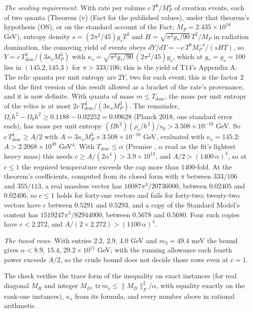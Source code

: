 \emph{The seeding requirement.} With rate per volume $c\,T^{8}/M_{P}^{4}$ of creation events, each of two quanta (Theorem (v) (Fact  for the published values), under that theorem's hypothesis (OS), or on the standard account of the Fact; $M_{P} = 2.435 \times 10^{18}$ GeV), entropy density $s = (2\pi^{2}/45)g_{s}T^{3}$ and $H = \sqrt{\pi^{2}g_{*}/90}\,T^{2}/M_{P}$ in radiation domination, the comoving yield of events obeys $dY/dT = -c\,T^{8}M_{P}^{-4}/(sHT)$, so $Y = c\,T_{\mathrm{desc}}^{3}/(3\kappa_{s}M_{P}^{3})$ with $\kappa_{s} = \sqrt{\pi^{2}g_{*}/90}\,(2\pi^{2}/45)g_{s}$, which at $g_{*} = g_{s} = 100$ lies in $(145.2, 145.3)$ for $\pi > 333/106$; this is the yield of T14's Appendix A. The relic quanta per unit entropy are $2Y$, two for each event; this is the factor $2$ that the first version of this result allowed as a bracket of the rate's provenance, and it is now definite. With quanta of mass $m \le T_{\mathrm{desc}}$, the mass per unit entropy of the relics is at most $2c\,T_{\mathrm{desc}}^{4}/(3\kappa_{s}M_{P}^{3})$. The remainder, $\Omega_{c}h^{2} - \Omega_{b}h^{2} \ge 0.1188 - 0.02252 = 0.09628$ (Planck 2018, one standard error each), has mass per unit entropy $(\Omega h^{2})(\rho_{c}/h^{2})/s_{0} > 3.508 \times 10^{-10}$ GeV. So $c\,T_{\mathrm{desc}}^{4} \ge A/2$ with $A = 3\kappa_{s}M_{P}^{3} \times 3.508 \times 10^{-10}$ GeV, evaluated with $\kappa_{s} = 145.2$: $A > 2.2068 \times 10^{48}$ GeV$^{4}$. With $T_{\mathrm{desc}} \le \alpha$ (Premise , $\alpha$ read as the fit's lightest heavy mass) this needs $c \ge A/(2\alpha^{4}) > 3.9 \times 10^{12}$, and $A/2 > (1400\,\alpha)^{4}$, so at $c \le 1$ the required temperature exceeds the cap more than $1400$-fold. At the theorem's coefficients, computed from its closed form with $\pi$ between $333/106$ and $355/113$, a real massless vector has $16087\pi^{3}/20736000$, between $0.02405$ and $0.02406$, so $c \le 1$ holds for forty-one vectors and fails for forty-two; twenty-two vectors have $c$ between $0.5291$ and $0.5293$, and a copy of the Standard Model's content has $1519247\pi^{3}/82944000$, between $0.5678$ and $0.5680$. Four such copies have $c < 2.272$, and $A/(2 \times 2.272) > (1100\,\alpha)^{4}$.

\emph{The tuned rows.} With entries $2.2$, $2.9$, $4.0$ GeV and $m_{3} = 49.4$ meV the bound gives $\alpha < 8.9$, $15.4$, $29.2 \times 10^{11}$ GeV; with the running allowance each fourth power exceeds $A/2$, so the crude bound does not decide those rows even at $c = 1$.

The check verifies the trace form of the inequality on exact instances (for real diagonal $M_{R}$ and integer $M_{D}$, $\mathrm{tr}\,m_{\nu} \le \lVert M_{D}\rVert_{F}^{2}/\alpha$, with equality exactly on the rank-one instances), $\kappa_{s}$ from its formula, and every number above in rational arithmetic.
